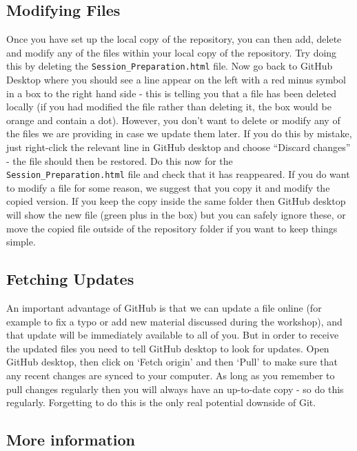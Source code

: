 \documentclass[
  12pt,
]{article}
\begin{document}
\hypertarget{modifying-files}{%
\subsection{Modifying Files}\label{modifying-files}}

Once you have set up the local copy of the repository, you can then add,
delete and modify any of the files within your local copy of the
repository. Try doing this by deleting the
\texttt{\textquotesingle{}Session\_Preparation.html\textquotesingle{}}
file. Now go back to GitHub Desktop where you should see a line appear
on the left with a red minus symbol in a box to the right hand side -
this is telling you that a file has been deleted locally (if you had
modified the file rather than deleting it, the box would be orange and
contain a dot). However, you don't want to delete or modify any of the
files we are providing in case we update them later. If you do this by
mistake, just right-click the relevant line in GitHub desktop and choose
``Discard changes'' - the file should then be restored. Do this now for
the
\texttt{\textquotesingle{}Session\_Preparation.html\textquotesingle{}}
file and check that it has reappeared. If you do want to modify a file
for some reason, we suggest that you copy it and modify the copied
version. If you keep the copy inside the same folder then GitHub desktop
will show the new file (green plus in the box) but you can safely ignore
these, or move the copied file outside of the repository folder if you
want to keep things simple.

\hypertarget{fetching-updates}{%
\subsection{Fetching Updates}\label{fetching-updates}}

An important advantage of GitHub is that we can update a file online
(for example to fix a typo or add new material discussed during the
workshop), and that update will be immediately available to all of you.
But in order to receive the updated files you need to tell GitHub
desktop to look for updates. Open GitHub desktop, then click on `Fetch
origin' and then `Pull' to make sure that any recent changes are synced
to your computer. As long as you remember to pull changes regularly then
you will always have an up-to-date copy - so do this regularly.
Forgetting to do this is the only real potential downside of Git.

\hypertarget{more-information}{%
\subsection{More information}\label{more-information}}
\end{document}

